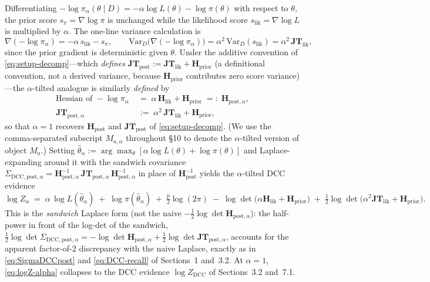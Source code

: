 \documentclass[11pt]{article}
\begin{document}
Differentiating $-\log\pi_\alpha(\theta\mid D) = -\alpha\log L(\theta)
- \log\pi(\theta)$ with respect to $\theta$, the prior score
$s_{\pi} = \nabla\log\pi$ is unchanged while the likelihood score $s_{\mathrm{lik}}
= \nabla\log L$ is multiplied by $\alpha$. The one-line variance calculation is
\[
\nabla(-\log\pi_\alpha) = -\alpha\, s_{\mathrm{lik}} - s_\pi,
\qquad
\mathrm{Var}_D\bigl(\nabla(-\log\pi_\alpha)\bigr) = \alpha^2\,\mathrm{Var}_D(s_{\mathrm{lik}})
= \alpha^2\,\mathbf{JT}_{\mathrm{lik}},
\]
since the prior gradient is deterministic given $\theta$. Under the additive
convention of \eqref{eq:setup-decomp}---which \emph{defines} $\mathbf{JT}_{\mathrm{post}}
:= \mathbf{JT}_{\mathrm{lik}} + \mathbf H_{\mathrm{prior}}$ (a definitional
convention, not a derived variance, because $\mathbf H_{\mathrm{prior}}$
contributes zero score variance)---the $\alpha$-tilted analogue is similarly
\emph{defined} by
\begin{align}
\text{Hessian of } -\log\pi_\alpha
&\;=\;
\alpha\,\mathbf H_{\mathrm{lik}} + \mathbf H_{\mathrm{prior}}
\;=:\;
\mathbf H_{\mathrm{post},\alpha},
\label{eq:Hpost-alpha}
\\[2pt]
\mathbf{JT}_{\mathrm{post},\alpha}
&\;:=\;
\alpha^2\,\mathbf{JT}_{\mathrm{lik}} + \mathbf H_{\mathrm{prior}},
\label{eq:JTpost-alpha}
\end{align}
so that $\alpha = 1$ recovers $\mathbf H_{\mathrm{post}}$ and
$\mathbf{JT}_{\mathrm{post}}$ of \eqref{eq:setup-decomp}. (We use the
comma-separated subscript $M_{a,\alpha}$ throughout \S10 to denote the
$\alpha$-tilted version of object $M_a$.) Setting
$\hat\theta_\alpha := \arg\max_\theta [\alpha\log L(\theta) + \log\pi(\theta)]$
and Laplace-expanding around it with the sandwich covariance
$\Sigma_{\mathrm{DCC},\mathrm{post},\alpha}
= \mathbf H_{\mathrm{post},\alpha}^{-1}\,\mathbf{JT}_{\mathrm{post},\alpha}\,
\mathbf H_{\mathrm{post},\alpha}^{-1}$ in place of $\mathbf H_{\mathrm{post}}^{-1}$
yields the $\alpha$-tilted DCC evidence
\begin{equation}
\log Z_\alpha
\;=\;
\alpha\,\log L(\hat\theta_\alpha)
\;+\;
\log\pi(\hat\theta_\alpha)
\;+\;
\tfrac{p}{2}\log(2\pi)
\;-\;
\log\det\!\bigl(\alpha\mathbf H_{\mathrm{lik}} + \mathbf H_{\mathrm{prior}}\bigr)
\;+\;
\tfrac{1}{2}\log\det\!\bigl(\alpha^2\mathbf{JT}_{\mathrm{lik}} + \mathbf H_{\mathrm{prior}}\bigr).
\label{eq:logZ-alpha}
\end{equation}
This is the \emph{sandwich} Laplace form (not the naive $-\tfrac{1}{2}\log\det
\mathbf H_{\mathrm{post},\alpha}$): the half-power in front of the log-det of
the sandwich, $\tfrac{1}{2}\log\det\Sigma_{\mathrm{DCC},\mathrm{post},\alpha}
= -\log\det \mathbf H_{\mathrm{post},\alpha} + \tfrac{1}{2}\log\det
\mathbf{JT}_{\mathrm{post},\alpha}$, accounts for the apparent factor-of-2
discrepancy with the naive Laplace, exactly as in \eqref{eq:SigmaDCCpost} and
\eqref{eq:DCC-recall} of Sections~1 and~3.2. At $\alpha = 1$,
\eqref{eq:logZ-alpha} collapses to the DCC evidence $\log Z_{\mathrm{DCC}}$ of
Sections~3.2 and~7.1.
\end{document}
